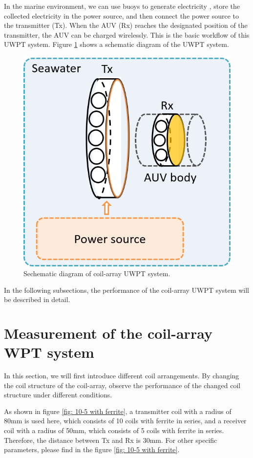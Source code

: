 In the marine environment, we can use buoys to generate electricity \cite{Orekan}, store the collected electricity in the power source, and then connect the power source to the transmitter (Tx). When the AUV (Rx) reaches the designated position of the transmitter, the AUV can be charged wirelessly. This is the basic workflow of this UWPT system.
Figure \ref{fig:3_coil_array_uwpt} shows a schematic diagram of the UWPT system.

\begin{figure}[!t]
    \centering
    \includegraphics[width=0.5\linewidth]{images/3_coil_array_uwpt.png}
    \caption{Sechematic diagram of coil-array UWPT system.}
    \label{fig:3_coil_array_uwpt}
\end{figure}
In the following subsections, the performance of the coil-array UWPT system will be described in detail.


\section{Measurement of the coil-array WPT system}

In this section, we will first introduce different coil arrangements. By changing the coil structure of the coil-array, observe the performance of the changed coil structure under different conditions.

As shown in figure \ref{fig: 10-5 with ferrite}, a transmitter coil with a radius of 80mm is used here, which consists of 10 coils with ferrite in series, and a receiver coil with a radius of 50mm, which consists of 5 coils with ferrite in series. Therefore, the distance between Tx and Rx is 30mm. For other specific parameters, please find in the figure \ref{fig: 10-5 with ferrite}.


